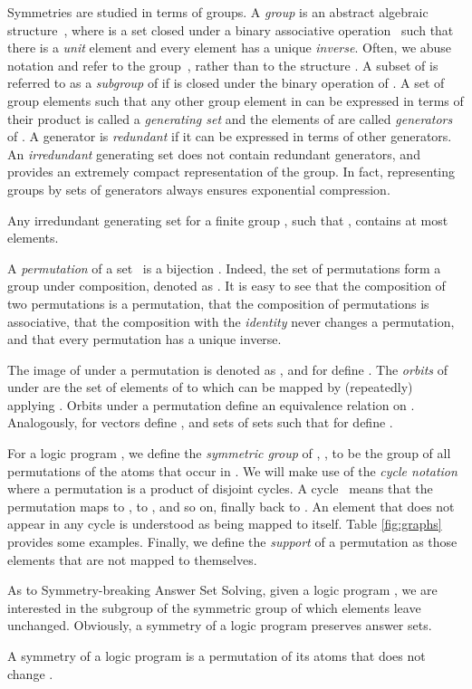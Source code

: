 \documentclass[envcountsame]{llncs}
\begin{document}
Symmetries are studied in terms of groups. A \emph{group} is an abstract algebraic structure~, where  is a set closed under a binary associative operation~ such that there is a \emph{unit} element and every element has a unique \emph{inverse}. Often, we abuse notation and refer to the group~, rather than to the structure . A subset  of  is referred to as a \emph{subgroup} of  if  is closed under the binary operation of . A set of group elements  such that any other group element in  can be expressed in terms of their product is called a \emph{generating set} and the elements of  are called \emph{generators} of . A generator is \emph{redundant} if it can be expressed in terms of other generators. An \emph{irredundant} generating set does not contain redundant generators, and provides an extremely compact representation of the group. In fact, representing groups by sets of generators always ensures exponential compression.
\begin{theorem}
Any irredundant generating set for a finite group , such that , contains at most  elements.
\end{theorem}
A \emph{permutation} of a set~ is a bijection . Indeed, the set of permutations form a group under composition, denoted as . It is easy to see that the composition of two permutations is a permutation, that the composition of permutations is associative, that the composition with the \emph{identity} never changes a permutation, and that every permutation has a unique inverse.


The image of  under a permutation  is denoted as , and for  define . The \emph{orbits} of  under  are the set of elements of  to which  can be mapped by (repeatedly) applying . Orbits under a permutation define an equivalence relation on . Analogously, for vectors  define , and sets of sets  such that  for  define .

For a logic program , we define the \emph{symmetric group} of , , to be the group of all permutations of the atoms that occur in .
We will make use of the \emph{cycle notation} where a permutation is a product of disjoint cycles. A cycle~ means that the permutation maps  to ,  to , and so on, finally  back to . An element that does not appear in any cycle is understood as being mapped to itself. Table \ref{fig:graphs} provides some examples. Finally, we define the \emph{support} \cite{mc81a} of a permutation as those elements that are not mapped to themselves.

As to Symmetry-breaking Answer Set Solving, given a logic program , we are interested in the subgroup of the symmetric group of  which elements leave  unchanged. Obviously, a symmetry of a logic program preserves answer sets.
\begin{definition}
A symmetry of a logic program  is a permutation of its atoms that does not change .
\end{definition}
\end{document}
